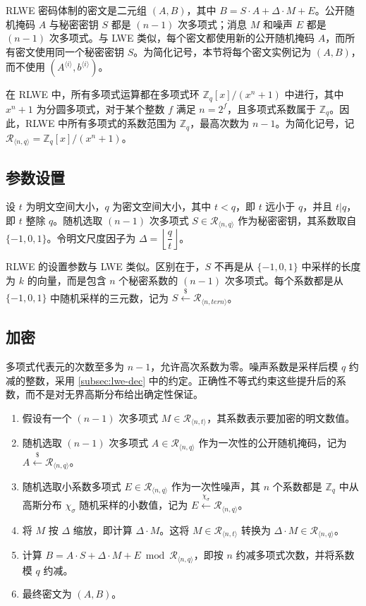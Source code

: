 RLWE 密码体制的密文是二元组 $(A, B)$，其中 $B = S \cdot A + \Delta \cdot M + E$。公开随机掩码 $A$ 与秘密密钥 $S$ 都是 $(n-1)$ 次多项式；消息 $M$ 和噪声 $E$ 都是 $(n-1)$ 次多项式。与 LWE 类似，每个密文都使用新的公开随机掩码 $A$，而所有密文使用同一个秘密密钥 $S$。为简化记号，本节将每个密文实例记为 $(A, B)$，而不使用 $(A^{\langle i \rangle}, b^{\langle i \rangle})$。

在 RLWE 中，所有多项式运算都在多项式环 $\mathbb{Z}_q[x] / (x^n + 1)$ 中进行，其中 $x^n + 1$ 为分圆多项式，对于某个整数 $f$ 满足 $n = 2^f$，且多项式系数属于 $\mathbb{Z}_q$。因此，RLWE 中所有多项式的系数范围为 $\mathbb{Z}_q$，最高次数为 $n -1$。为简化记号，记 $\mathcal{R}_{\langle n,q \rangle} = \mathbb{Z}_q[x] / (x^n + 1)$。

\subsection{参数设置}

设 $t$ 为明文空间大小，$q$ 为密文空间大小，其中 $t < q$，即 $t$ 远小于 $q$，并且 $t | q$，即 $t$ 整除 $q$。随机选取 $(n-1)$ 次多项式 $S \in \mathcal{R}_{\langle n, q \rangle}$ 作为秘密密钥，其系数取自 $\{-1, 0, 1\}$。令明文尺度因子为 $\Delta = \left\lfloor\dfrac{q}{t}\right\rfloor$。

RLWE 的设置参数与 LWE 类似。区别在于，$S$ 不再是从 $\{-1, 0, 1\}$ 中采样的长度为 $k$ 的向量，而是包含 $n$ 个秘密系数的 $(n-1)$ 次多项式。每个系数都是从 $\{-1, 0, 1\}$ 中随机采样的三元数，记为 $S \xleftarrow{\$} \mathcal{R}_{\langle n, \textit{tern} \rangle}$。


\subsection{加密}
\label{subsec:rlwe-enc}

多项式代表元的次数至多为 $n-1$，允许高次系数为零。噪声系数是采样后模 $q$ 约减的整数，采用 \autoref{subsec:lwe-dec} 中的约定。正确性不等式约束这些提升后的系数，而不是对无界高斯分布给出确定性保证。

\begin{enumerate}
\item 假设有一个 $(n-1)$ 次多项式 $M \in \mathcal{R}_{\langle n, t \rangle}$，其系数表示要加密的明文数值。
\item 随机选取 $(n-1)$ 次多项式 $A \in \mathcal{R}_{\langle n,q \rangle}$ 作为一次性的公开随机掩码，记为 $A \xleftarrow{\$} \mathcal{R}_{\langle n, q \rangle}$。
\item 随机选取小系数多项式 $E \in \mathcal{R}_{\langle n,q \rangle}$ 作为一次性噪声，其 $n$ 个系数都是 $\mathbb{Z}_q$ 中从高斯分布 $\chi_\sigma$ 随机采样的小数值，记为 $E \xleftarrow{\chi_\sigma} \mathcal{R}_{\langle n, q \rangle}$。
\item 将 $M$ 按 $\Delta$ 缩放，即计算 $\Delta \cdot M$。这将 $M \in \mathcal{R}_{\langle n,t \rangle}$ 转换为 $\Delta \cdot M \in \mathcal{R}_{\langle n,q \rangle}$。
\item 计算 $B = A \cdot S + \Delta \cdot M + E \bmod \mathcal{R}_{\langle n,q \rangle}$，即按 $n$ 约减多项式次数，并将系数模 $q$ 约减。
\item 最终密文为 $(A, B)$。
\end{enumerate}

